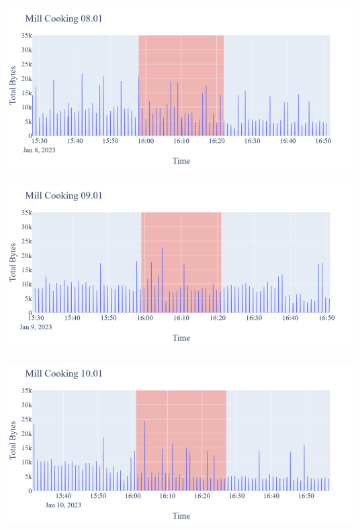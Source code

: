 \begin{figure}[H]
    \begin{subfigure}[b]{0.47\textwidth}
        \centering
        \includegraphics[width=1.2\hsize]{figures/Mill_Cooking_Bytes_08.01.png}
    \end{subfigure}
    \begin{subfigure}[b]{0.47\textwidth}
        \centering
        \includegraphics[width=1.2\hsize]{figures/Mill_Cooking_Bytes_09.01.png}
    \end{subfigure}
    \begin{subfigure}[b]{0.47\textwidth}
        \centering
        \includegraphics[width=1.2\hsize]{figures/Mill_Cooking_Bytes_10.01.png}
    \end{subfigure}
    \begin{subfigure}[b]{0.47\textwidth}

\end{subfigure}
\end{figure}
